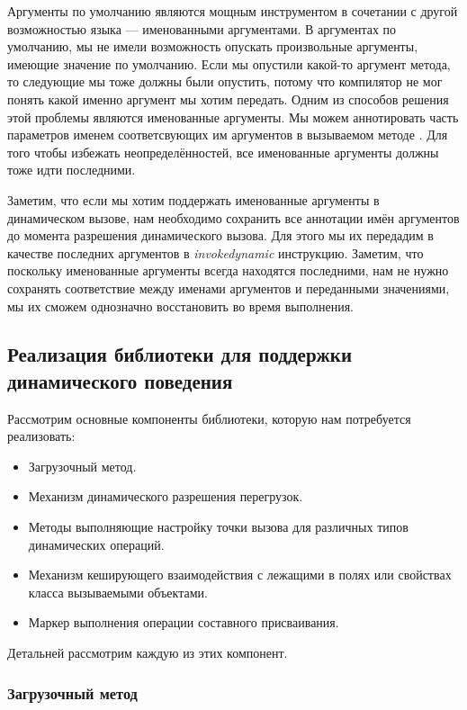Аргументы по умолчанию являются мощным инструментом в сочетании с другой возможностью языка --- именованными аргументами. В аргументах по умолчанию, мы не имели возможность опускать произвольные аргументы, имеющие значение по умолчанию. Если мы опустили какой-то аргумент метода, то следующие мы тоже должны были опустить, потому что компилятор не мог понять какой именно аргумент мы хотим передать. Одним из способов решения этой проблемы являются именованные аргументы. Мы можем аннотировать часть параметров именем соответсвующих им аргументов в вызываемом методе \cite{book:jemerov2017kotlininAction}. Для того чтобы избежать неопределённостей, все именованные аргументы должны тоже идти последними.

Заметим, что если мы хотим поддержать именованные аргументы в динамическом вызове, нам необходимо сохранить все аннотации имён аргументов до момента разрешения динамического вызова. Для этого мы их передадим в качестве последних аргументов в \textit{invokedynamic} инструкцию. Заметим, что поскольку именованные аргументы всегда находятся последними, нам не нужно сохранять соответствие между именами аргументов и переданными значениями, мы их сможем однозначно восстановить во время выполнения.


\subsection{Реализация библиотеки для поддержки динамического поведения}
\label{sec:dynamicLibrary}

Рассмотрим основные компоненты библиотеки, которую нам потребуется реализовать:

\begin{itemize}
    \item Загрузочный метод.
    \item Механизм динамического разрешения перегрузок.
    \item Методы выполняющие настройку точки вызова для различных типов динамических операций.
    \item Механизм кеширующего взаимодействия с лежащими в полях или свойствах класса вызываемыми объектами.
    \item Маркер выполнения операции составного присваивания.
\end{itemize}

Детальней рассмотрим каждую из этих компонент.

\subsubsection{Загрузочный метод}

